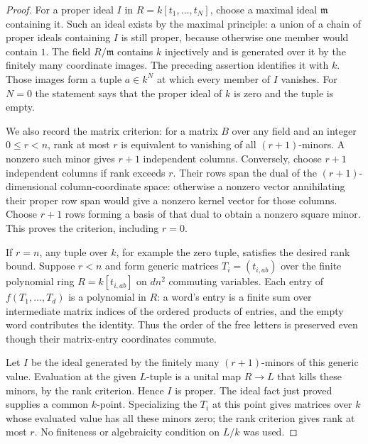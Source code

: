 \documentclass{article}
\begin{document}
\begin{proof}
For a proper ideal $I$ in $R=k[t_1,\ldots,t_N]$, choose a maximal ideal $\mathfrak m$ containing it. Such an ideal exists by the maximal principle: a union of a chain of proper ideals containing $I$ is still proper, because otherwise one member would contain $1$. The field $R/\mathfrak m$ contains $k$ injectively and is generated over it by the finitely many coordinate images. The preceding assertion identifies it with $k$. Those images form a tuple $a\in k^N$ at which every member of $I$ vanishes. For $N=0$ the statement says that the proper ideal of $k$ is zero and the tuple is empty.

We also record the matrix criterion: for a matrix $B$ over any field and an integer $0\leq r<n$, rank at most $r$ is equivalent to vanishing of all $(r+1)$-minors. A nonzero such minor gives $r+1$ independent columns. Conversely, choose $r+1$ independent columns if rank exceeds $r$. Their rows span the dual of the $(r+1)$-dimensional column-coordinate space: otherwise a nonzero vector annihilating their proper row span would give a nonzero kernel vector for those columns. Choose $r+1$ rows forming a basis of that dual to obtain a nonzero square minor. This proves the criterion, including $r=0$.

If $r=n$, any tuple over $k$, for example the zero tuple, satisfies the desired rank bound. Suppose $r<n$ and form generic matrices $T_i=(t_{i,ab})$ over the finite polynomial ring $R=k[t_{i,ab}]$ on $dn^2$ commuting variables. Each entry of $f(T_1,\ldots,T_d)$ is a polynomial in $R$: a word's entry is a finite sum over intermediate matrix indices of the ordered products of entries, and the empty word contributes the identity. Thus the order of the free letters is preserved even though their matrix-entry coordinates commute.

Let $I$ be the ideal generated by the finitely many $(r+1)$-minors of this generic value. Evaluation at the given $L$-tuple is a unital map $R\to L$ that kills these minors, by the rank criterion. Hence $I$ is proper. The ideal fact just proved supplies a common $k$-point. Specializing the $T_i$ at this point gives matrices over $k$ whose evaluated value has all these minors zero; the rank criterion gives rank at most $r$. No finiteness or algebraicity condition on $L/k$ was used.
\end{proof}
\end{document}
